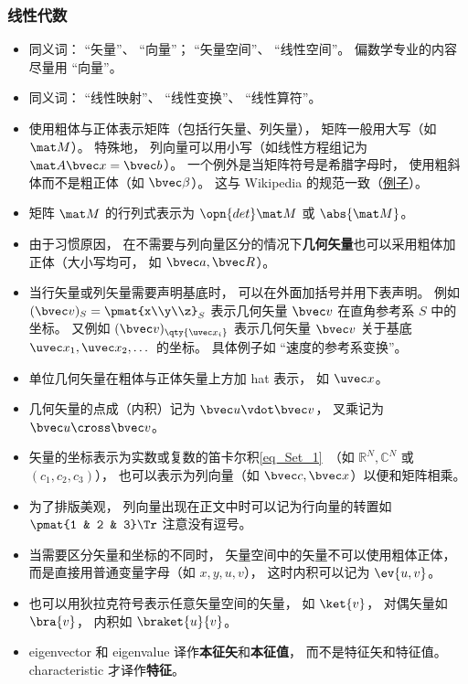 \subsubsection{线性代数}
\begin{itemize}
\item 同义词： “矢量”、 “向量”； “矢量空间”、 “线性空间”。 偏数学专业的内容尽量用 “向量”。
\item 同义词： “线性映射”、 “线性变换”、 “线性算符”。
\item 使用粗体与正体表示矩阵（包括行矢量、列矢量）， 矩阵一般用大写（如 $\mat M$）。 特殊地， 列向量可以用小写（如线性方程组记为 $\mat A \bvec x = \bvec b$）。 一个例外是当矩阵符号是希腊字母时， 使用粗斜体而不是粗正体（如 $\bvec \beta$）。 这与 Wikipedia 的规范一致（\href{https://en.wikipedia.org/wiki/Angular_acceleration}{例子}）。
\item 矩阵 $\mat M$ 的行列式表示为 $\opn{det}\mat M$ 或 $\abs{\mat M}$。
\item 由于习惯原因， 在不需要与列向量区分的情况下\textbf{几何矢量}也可以采用粗体加正体（大小写均可， 如 $\bvec a, \bvec R$）。
\item 当行矢量或列矢量需要声明基底时， 可以在外面加括号并用下表声明。 例如 $(\bvec v)_S = \pmat{x\\y\\z}_S$ 表示几何矢量 $\bvec v$ 在直角参考系 $S$ 中的坐标。 又例如 $(\bvec v)_{\qty{\uvec x_i}}$ 表示几何矢量 $\bvec v$ 关于基底 $\uvec x_1, \uvec x_2, \dots$ 的坐标。 具体例子如 “速度的参考系变换”。
\item 单位几何矢量在粗体与正体矢量上方加 hat 表示， 如 $\uvec x$。
\item 几何矢量的点成（内积）记为 $\bvec u \vdot \bvec v$， 叉乘记为 $\bvec u \cross \bvec v$。
\item 矢量的坐标表示为实数或复数的笛卡尔积\autoref{eq_Set_1}~（如 $\mathbb R^N, \mathbb C^N$ 或 $(c_1, c_2, c_3)$）， 也可以表示为列向量（如 $\bvec c, \bvec x$）以便和矩阵相乘。
\item 为了排版美观， 列向量出现在正文中时可以记为行向量的转置如 $\pmat{1 & 2 & 3}\Tr$ 注意没有逗号。
\item 当需要区分矢量和坐标的不同时， 矢量空间中的矢量不可以使用粗体正体， 而是直接用普通变量字母（如 $x, y, u, v$）， 这时内积可以记为 $\ev{u, v}$。
\item 也可以用狄拉克符号表示任意矢量空间的矢量， 如 $\ket{v}$， 对偶矢量如 $\bra{v}$， 内积如 $\braket{u}{v}$。
\item eigenvector 和 eigenvalue 译作\textbf{本征矢}和\textbf{本征值}， 而不是特征矢和特征值。 characteristic 才译作\textbf{特征}。
\end{itemize}

